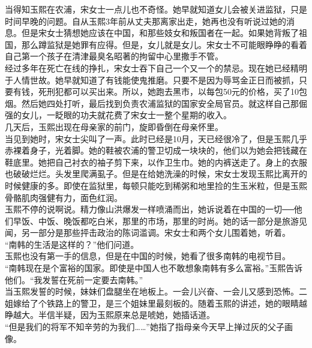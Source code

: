 \ifnum{}
	\begin{multicols}{\theparacolNo}
\fi
当得知玉熙在农浦，宋女士一点儿也不奇怪。她早就知道女儿会被关进监狱，只是时间早晚的问题。自从玉熙3年前从丈夫那离家出走，她再也没有听说过她的消息。但是宋女士猜想她应该在中国，和那些妓女和叛国者在一起。如果她背叛了祖国，那么蹲监狱是她罪有应得。但是，女儿就是女儿。宋女士不可能眼睁睁的看着自己第一个孩子在清津最臭名昭著的拘留中心里撒手不管。\\

经过多年在死亡在线的挣扎，宋女士吞下自己一个又一个的禁忌。现在她已经精明于人情世故。她早就知道了有钱能使鬼推磨。只要不是因为辱骂金正日而被抓，只要有钱，死刑犯都可以买出来。所以，她跑去黑市，以每包50元的价格，买了10包烟。然后她四处打听，最后找到负责农浦监狱的国家安全局官员。就这样自己那倔强的女儿，一眨眼的功夫就花费了宋女士一整个星期的收入。\\

几天后，玉熙出现在母亲家的前门，旋即昏倒在母亲怀里。\\

当见到她时，宋女士尖叫了一声。此时已经是10月，天已经很冷了，但是玉熙几乎赤裸着身子，光着脚。她的鞋被农浦的警卫切成一块块的，他们以为她会把钱藏在鞋底里。她把自己衬衣的袖子剪下来，以作卫生巾。她的内裤送走了。身上的衣服也破破烂烂。头发里爬满虱子。但是在给她洗澡的时候，宋女士发现玉熙比离开的时候健康的多。即使在监狱里，每顿只能吃到稀粥和地里捡的生玉米粒，但是玉熙骨骼肌肉强健有力，面色红润。\\

玉熙不停的说啊说。精力像山洪爆发一样喷涌而出，她诉说着在中国的一切──他们早饭、中饭、晚饭都吃白米，那里的市场，那里的时尚。她的话一部分是旅游见闻，另一部分是那些抨击政治的陈词滥调。宋女士和两个女儿围着她，听着。\\

“南韩的生活是这样的？”他们问道。\\

玉熙也没有第一手的信息，但是在中国的时候，她看了很多南韩的电视节目。\\

“南韩现在是个富裕的国家。即使是中国人也不敢想象南韩有多么富裕。”玉熙告诉他们。“我发誓在死前一定要去南韩。”\\

当玉熙发誓的时候，妹妹们盘腿坐在地板上。一会儿兴奋、一会儿又感到恐怖。二姐嫁给了个铁路上的警卫，是三个姐妹里最刻板的。随着玉熙的讲述，她的眼睛越睁越大。半信半疑，因为玉熙原来总是唬她，她插话道。\\

“但是我们的将军不知辛劳的为我们……”她指了指母亲今天早上掸过灰的父子画像。\\


\end{multicols}
